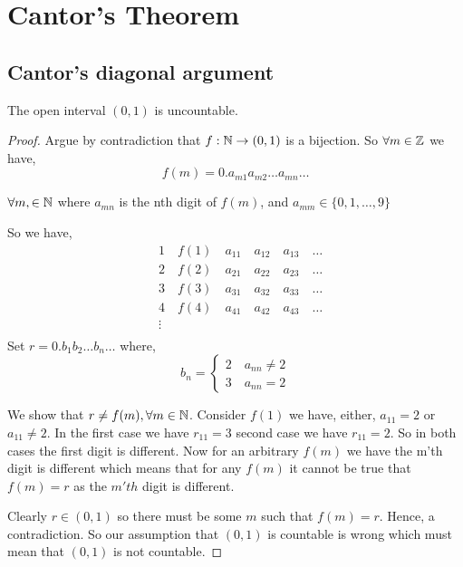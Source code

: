 \section{Cantor's Theorem}


\subsection*{Cantor's diagonal argument}
\begin{theorem}
    The open interval $(0, 1)$ is uncountable. 
\end{theorem}
\begin{proof}
    Argue by contradiction that $f: \mathbb{N} \to (0, 1)$ is a bijection. So  $\forall m \in \mathbb{Z}$ we have,  
    $$ f(m) = 0.a_{m1}a_{m2}\dots a_{mn} \dots$$

    $\forall m,  \in \mathbb{N}$ where  $a_{mn}$ is the nth digit of $f(m)$, and  $a_{mm} \in \{0, 1, \dots, 9\}$


    So we have, 
\begin{align*}
&    1 \quad f(1) \quad a_{11} \quad a_{12} \quad a_{13} \quad \dots\\
&    2 \quad f(2) \quad a_{21} \quad  a_{22}\quad a_{23} \quad \dots\\
&    3 \quad f(3) \quad a_{31}  \quad a_{32} \quad a_{33} \quad \dots\\
&    4 \quad f(4) \quad a_{41}  \quad a_{42}  \quad a_{43} \quad \dots\\
&    \vdots\\
\end{align*}            
Set $r = 0.b_1b_2\dots b_n \dots $ where, 
$$ b_n = \begin{cases} 2\quad a_{nn} \ne 2  \\ 3 \quad a_{nn} = 2\end{cases} $$ 

We show that $r \ne f(m), \forall m \in \mathbb{N}$. Consider  $f(1)$ we have, either,  $a_{11} = 2$ or $a_{11} \ne 2$. In the first case we have $r_{11} = 3$ second case we have $r_{11} = 2$. So in both cases the first digit is different. Now for an arbitrary $f(m)$ we have the m'th digit is different which means that for any  $f(m)$ it cannot be true that  $f(m) = r$ as the  $m'th$ digit is different.


\vspace{1em}

Clearly $r \in (0, 1)$ so there must be some $m$ such that $f(m) = r$. Hence, a contradiction. So our assumption that $(0, 1)$ is countable is wrong which must mean that  $(0, 1)$ is not countable.


\end{proof}

